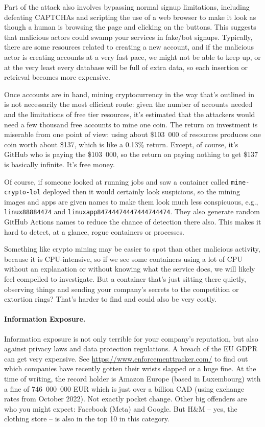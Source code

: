 Part of the attack also involves bypassing normal signup limitations, including defeating CAPTCHAs and scripting the use of a web browser to make it look as though a human is browsing the page and clicking on the buttons. This suggests that malicious actors could swamp your services in fake/bot signups. Typically, there are some resources related to creating a new account, and if the malicious actor is creating accounts at a very fast pace, we might not be able to keep up, or at the very least every database will be full of extra data, so each insertion or retrieval becomes more expensive.

Once accounts are in hand, mining cryptocurrency in the way that's outlined in~\cite{sysdig} is not necessarily the most efficient route: given the number of accounts needed and the limitations of free tier resources, it's estimated that the attackers would need a few thousand free accounts to mine one coin. The return on investment is miserable from one point of view: using about \$103~000 of resources produces one coin worth about \$137, which is like a 0.13\% return. Except, of course, it's GitHub who is paying the \$103~000, so the return on paying nothing to get \$137 is basically infinite. It's free money.

Of course, if someone looked at running jobs and saw a container called \texttt{mine-crypto-lol} deployed then it would certainly look suspicious, so the mining images and apps are given names to make them look much less conspicuous, e.g., \texttt{linux88884474} and \texttt{linuxapp84744474447444744474}. They also generate random GitHub Actions names to reduce the chance of detection there also. This makes it hard to detect, at a glance, rogue containers or processes. 

Something like crypto mining may be easier to spot than other malicious activity, because it is CPU-intensive, so if we see some containers using a lot of CPU without an explanation or without knowing what the service does, we will likely feel compelled to investigate. But a container that's just sitting there quietly, observing things and sending your company's secrets to the competition or extortion rings? That's harder to find and could also be very costly.

\paragraph{Information Exposure.}
Information exposure is not only terrible for your company's reputation, but also against privacy laws and data protection regulations. A breach of the EU GDPR can get very expensive. See \url{https://www.enforcementtracker.com/} to find out which companies have recently gotten their wrists slapped or a huge fine. At the time of writing, the record holder is Amazon Europe (based in Luxembourg) with a fine of 746~000~000 EUR which is just over a billion CAD (using exchange rates from October 2022). Not exactly pocket change. Other big offenders are who you might expect: Facebook (Meta) and Google. But H\&M -- yes, the clothing store -- is also in the top 10 in this category.

